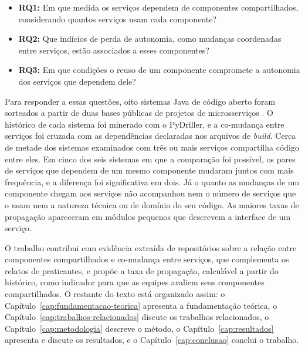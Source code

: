 \begin{itemize}
  \item \textbf{RQ1:} Em que medida os serviços dependem de componentes compartilhados, considerando quantos serviços usam cada componente?
  \item \textbf{RQ2:} Que indícios de perda de autonomia, como mudanças coordenadas entre serviços, estão associados a esses componentes?
  \item \textbf{RQ3:} Em que condições o reuso de um componente compromete a autonomia dos serviços que dependem dele?
\end{itemize}

Para responder a essas questões, oito sistemas Java de código aberto foram sorteados a partir de duas bases públicas de projetos de microsserviços \cite{rahman2019,aragona2024dataset}. O histórico de cada sistema foi minerado com o PyDriller, e a co-mudança entre serviços foi cruzada com as dependências declaradas nos arquivos de \textit{build}. Cerca de metade dos sistemas examinados com três ou mais serviços compartilha código entre eles. Em cinco dos seis sistemas em que a comparação foi possível, os pares de serviços que dependem de um mesmo componente mudaram juntos com mais frequência, e a diferença foi significativa em dois. Já o quanto as mudanças de um componente chegam aos serviços não acompanhou nem o número de serviços que o usam nem a natureza técnica ou de domínio do seu código. As maiores taxas de propagação apareceram em módulos pequenos que descrevem a interface de um serviço.

O trabalho contribui com evidência extraída de repositórios sobre a relação entre componentes compartilhados e co-mudança entre serviços, que complementa os relatos de praticantes, e propõe a taxa de propagação, calculável a partir do histórico, como indicador para que as equipes avaliem seus componentes compartilhados. O restante do texto está organizado assim: o Capítulo~\ref{cap:fundamentacao-teorica} apresenta a fundamentação teórica, o Capítulo~\ref{cap:trabalhos-relacionados} discute os trabalhos relacionados, o Capítulo~\ref{cap:metodologia} descreve o método, o Capítulo~\ref{cap:resultados} apresenta e discute os resultados, e o Capítulo~\ref{cap:conclusao} conclui o trabalho.
